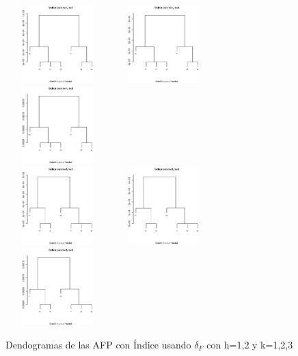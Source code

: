 \begin{figure}[!htp]
\centering
  \includegraphics[height=3cm, width=4cm]{i_df_h_1_k_1.eps}
  \includegraphics[height=3cm, width=4cm]{i_df_h_1_k_2.eps}
  \includegraphics[height=3cm, width=4cm]{i_df_h_1_k_3.eps}\\
  \includegraphics[height=3cm, width=4cm]{i_df_h_2_k_1.eps}
  \includegraphics[height=3cm, width=4cm]{i_df_h_2_k_2.eps}
  \includegraphics[height=3cm, width=4cm]{i_df_h_2_k_3.eps}
  \caption{Dendogramas de las  AFP  con \'Indice usando $\delta_{F}$ con h=1,2 y k=1,2,3}
\label{caja}
\end{figure}

